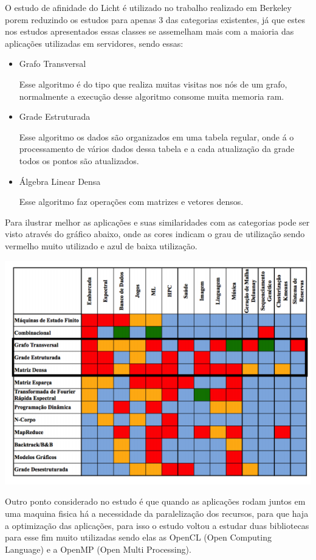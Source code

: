 O estudo de afinidade do Licht é utilizado no trabalho realizado em Berkeley porem reduzindo os estudos para apenas 3 das categorias existentes, já que estes nos estudos apresentados essas classes se assemelham mais com a maioria das aplicações utilizadas em servidores, sendo essas:


\begin{itemize}


\item Grafo Transversal

Esse algoritmo é do tipo que realiza muitas visitas nos nós de um grafo, normalmente a execução desse algoritmo consome muita memoria ram.

\item Grade Estruturada

Esse algoritmo os dados são organizados em uma tabela regular, onde á o processamento de vários dados dessa tabela e a cada atualização da grade todos os pontos são atualizados.

\item Álgebra Linear Densa

Esse algoritmo faz operações com matrizes e vetores densos.

\end{itemize}

Para ilustrar melhor as aplicações e suas similaridades com as categorias pode ser visto através do gráfico abaixo, onde as cores indicam o grau de utilização sendo vermelho muito utilizado e azul de baixa utilização.

\includegraphics[]{aplicacaoDwarfs.png}

Outro ponto considerado no estudo é que quando as aplicações rodam juntos em uma maquina fisica há a necessidade da paralelização dos recursos, para que haja a optimização das aplicações, para isso o estudo voltou a estudar duas bibliotecas para esse fim muito utilizadas sendo elas as  OpenCL (Open Computing Language) e a OpenMP (Open Multi Processing).


